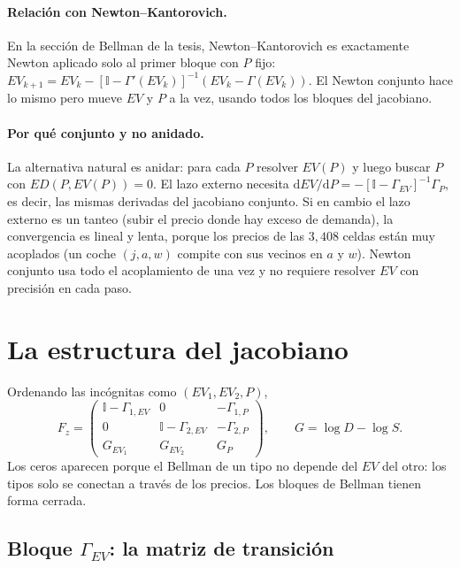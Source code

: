 \documentclass{article}
\begin{document}
\paragraph{Relación con Newton--Kantorovich.} En la sección de Bellman de la tesis, Newton--Kantorovich
es exactamente Newton aplicado solo al primer bloque con $P$ fijo:
$EV_{k+1}=EV_k-[\mathbb I-\Gamma'(EV_k)]^{-1}(EV_k-\Gamma(EV_k))$. El Newton conjunto hace lo mismo
pero mueve $EV$ y $P$ a la vez, usando todos los bloques del jacobiano.

\paragraph{Por qué conjunto y no anidado.} La alternativa natural es anidar: para cada $P$ resolver
$EV(P)$ y luego buscar $P$ con $ED(P,EV(P))=0$. El lazo externo necesita
$\mathrm dEV/\mathrm dP=-[\mathbb I-\Gamma_{EV}]^{-1}\Gamma_P$, es decir, las mismas derivadas del
jacobiano conjunto. Si en cambio el lazo externo es un tanteo (subir el precio donde hay exceso
de demanda), la convergencia es lineal y lenta, porque los precios de las $3{,}408$ celdas están muy
acoplados (un coche $(j,a,w)$ compite con sus vecinos en $a$ y $w$). Newton conjunto usa todo el
acoplamiento de una vez y no requiere resolver $EV$ con precisión en cada paso.

\section{La estructura del jacobiano}

Ordenando las incógnitas como $(EV_1,EV_2,P)$,
$$F_z=\begin{pmatrix}
\mathbb I-\Gamma_{1,EV} & 0 & -\Gamma_{1,P}\\
0 & \mathbb I-\Gamma_{2,EV} & -\Gamma_{2,P}\\
G_{EV_1} & G_{EV_2} & G_P
\end{pmatrix},\qquad G=\log D-\log S.$$
Los ceros aparecen porque el Bellman de un tipo no depende del $EV$ del otro: los tipos solo se
conectan a través de los precios. Los bloques de Bellman tienen forma cerrada.

\subsection{Bloque $\Gamma_{EV}$: la matriz de transición}
\end{document}
